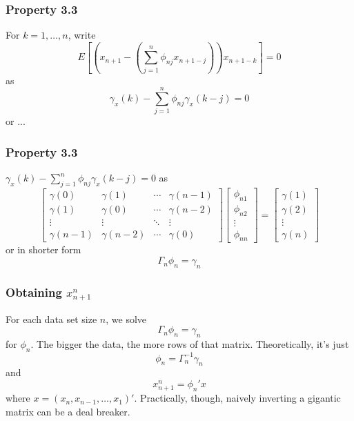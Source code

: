 \documentclass[%
xcolor=pdftex]{beamer}
\begin{document}
\begin{frame}
\frametitle{Property 3.3}

For $k=1,\ldots,n$, write
$$
E\left[ \left(x_{n+1} - \left( \sum_{j=1}^n \phi_{nj} x_{n+1-j}\right)\right)x_{n+1-k}  \right] = 0
$$
as
$$
\gamma_x(k) - \sum_{j=1}^n \phi_{nj}\gamma_x(k-j) = 0
$$
or ... 


\end{frame}


\begin{frame}
\frametitle{Property 3.3}
$\gamma_x(k) - \sum_{j=1}^n \phi_{nj}\gamma_x(k-j) = 0$
as
$$
\begin{bmatrix}
\gamma(0) & \gamma(1) & \cdots &\gamma(n-1) \\
\gamma(1) & \gamma(0) & \cdots & \gamma(n-2) \\
\vdots & \vdots & \ddots & \vdots \\
\gamma(n-1) & \gamma(n-2) & \cdots & \gamma(0)
\end{bmatrix}
\begin{bmatrix}
\phi_{n1} \\
\phi_{n2} \\
\vdots\\
\phi_{nn}
\end{bmatrix}
=
\begin{bmatrix}
\gamma(1) \\
\gamma(2) \\
\vdots \\
\gamma(n)
\end{bmatrix}
$$
or in shorter form
$$
\Gamma_n \phi_n = \gamma_n
$$


\end{frame}


\begin{frame}
\frametitle{Obtaining $x_{n+1}^n$ }

For each data set size $n$, we solve 
$$
\Gamma_n \phi_n = \gamma_n
$$
for $\phi_n$. The bigger the data, the more rows of that matrix. Theoretically, it's just
$$
\phi_n = \Gamma_n^{-1} \gamma_n
$$
and 
$$
x_{n+1}^n = \phi_n' x
$$
where $x = (x_n, x_{n-1}, \ldots, x_1)'$. Practically, though, naively inverting a gigantic matrix can be a deal breaker.

\end{frame}
\end{document}
